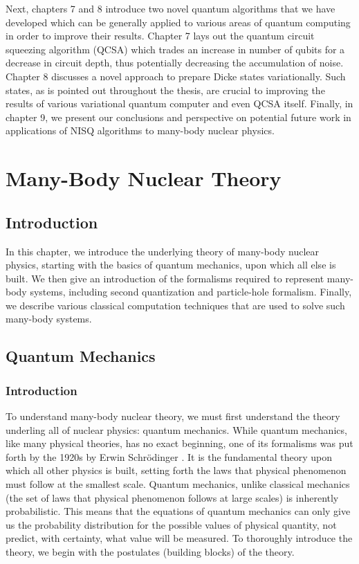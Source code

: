 \documentclass[Dual]{msu-thesis}
\begin{document}
Next, chapters 7 and 8 introduce two novel quantum algorithms that we have developed which can be generally applied to various areas of quantum computing in order to improve their results. Chapter 7 lays out the quantum circuit squeezing algorithm (QCSA) which trades an increase in number of qubits for a decrease in circuit depth, thus potentially decreasing the accumulation of noise. Chapter 8 discusses a novel approach to prepare Dicke states variationally. Such states, as is pointed out throughout the thesis, are crucial to improving the results of various variational quantum computer and even QCSA itself. Finally, in chapter 9, we present our conclusions and perspective on potential future work in applications of NISQ algorithms to many-body nuclear physics.

\chapter{Many-Body Nuclear Theory}

\section{Introduction} 

In this chapter, we introduce the underlying theory of many-body nuclear physics, starting with the basics of quantum mechanics, upon which all else is built. We then give an introduction of the formalisms required to represent many-body systems, including second quantization and particle-hole formalism. Finally, we describe various classical computation techniques that are used to solve such many-body systems.

\section{Quantum Mechanics}

\subsection{Introduction}

To understand many-body nuclear theory, we must first understand the theory underling all of nuclear physics: quantum mechanics. While quantum mechanics, like many physical theories, has no exact beginning, one of its formalisms was put forth by the 1920s by Erwin Schr\"{o}dinger \cite{schrodinger}. It is the fundamental theory upon which all other physics is built, setting forth the laws that physical phenomenon must follow at the smallest scale. Quantum mechanics, unlike classical mechanics (the set of laws that physical phenomenon follows at large scales) is inherently probabilistic. This means that the equations of quantum mechanics can only give us the probability distribution for the possible values of physical quantity, not predict, with certainty, what value will be measured. To thoroughly introduce the theory, we begin with the postulates (building blocks) of the theory.
\end{document}
